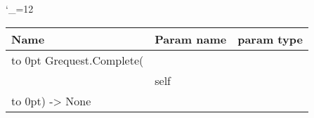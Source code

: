 \begingroup \catcode`\_=12 \tt
\begin{tabular}{lll}
\toprule
\textrm{Name}&\textrm{Param name}&\textrm{param type}\\
\midrule
\hbox to 0pt {Grequest.Complete(\hss}\\
& self\\
\hbox to 0pt{) -> None\hss}\\
\bottomrule
\end{tabular}
\endgroup

